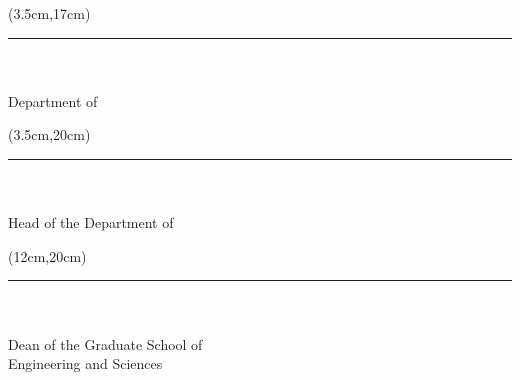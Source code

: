 \begin{spacing}{1}
	\begin{textblock*}{\textwidth}(3.5cm,17cm)
		\noindent\rule{5cm}{0.1mm}\\
		\textbf{\SupervisorTitle{ }\SupervisorName{ }
		\MakeUppercase\SupervisorSurname}\\
		Department of \SupervisorDepartment\\
		\SupervisorUniversity
	\end{textblock*}


	\begin{textblock*}{\textwidth}(3.5cm,20cm)
		\noindent\rule{5cm}{0.1mm}\\
		\textbf{\HeadOfTheDepartmentTitle{ }\HeadOfTheDepartmentName{ }
		\MakeUppercase\HeadOfTheDepartmentSurname}\\
		Head of the Department of\\
		\HeadOfTheDepartmentDepartment
	\end{textblock*}

	\begin{textblock*}{\textwidth}(12cm,20cm)
		\noindent\rule{5cm}{0.1mm}\\
		\textbf{\HeadOfTheGraduateSchoolTitle{ }\HeadOfTheGraduateSchoolName{ }
		\MakeUppercase\HeadOfTheGraduateSchoolSurname}\\
		Dean of the Graduate School of\\
		Engineering and Sciences
	\end{textblock*}
\end{spacing}
~\pagebreak
